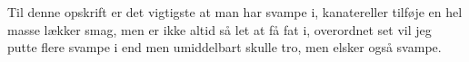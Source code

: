 \documentclass{book}
\begin{document}
Til denne opskrift er det vigtigste at man har svampe i, kanatereller tilføje en hel masse lækker smag, men er ikke altid så let at få fat i, overordnet set vil jeg putte flere svampe i end men umiddelbart skulle tro, men elsker også svampe.
\newpage {}
\end{document}

